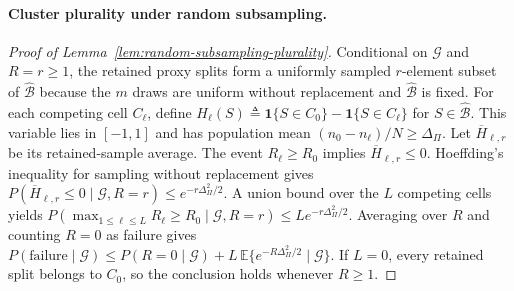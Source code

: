 \paragraph{Cluster plurality under random subsampling.}
\begin{proof}[ Proof of Lemma~\ref{lem:random-subsampling-plurality}]
Conditional on $\mathcal G$ and $R=r\ge1$, the retained proxy splits form a uniformly sampled $r$-element subset of $\widehat{\mathcal B}$ because the $m$ draws are uniform without replacement and $\widehat{\mathcal B}$ is fixed. For each competing cell $C_\ell$, define $H_\ell(S)\triangleq\mathbf 1\{S\in C_0\}-\mathbf 1\{S\in C_\ell\}$ for $S\in\widehat{\mathcal B}$. This variable lies in $[-1,1]$ and has population mean $(n_0-n_\ell)/N\ge\Delta_\Pi$. Let $\overline H_{\ell,r}$ be its retained-sample average. The event $R_\ell\ge R_0$ implies $\overline H_{\ell,r}\le0$. Hoeffding's inequality for sampling without replacement \citep{hoeffding1963probability} gives $P(\overline H_{\ell,r}\le0\mid\mathcal G,R=r)\le e^{-r\Delta_\Pi^2/2}$. A union bound over the $L$ competing cells yields $P(\max_{1\le\ell\le L}R_\ell\ge R_0\mid\mathcal G,R=r)\le L e^{-r\Delta_\Pi^2/2}$. Averaging over $R$ and counting $R=0$ as failure gives $P(\text{failure}\mid\mathcal G)\le P(R=0\mid\mathcal G)+L\,\mathbb E\{e^{-R\Delta_\Pi^2/2}\mid\mathcal G\}$. If $L=0$, every retained split belongs to $C_0$, so the conclusion holds whenever $R\ge1$.
\end{proof}

